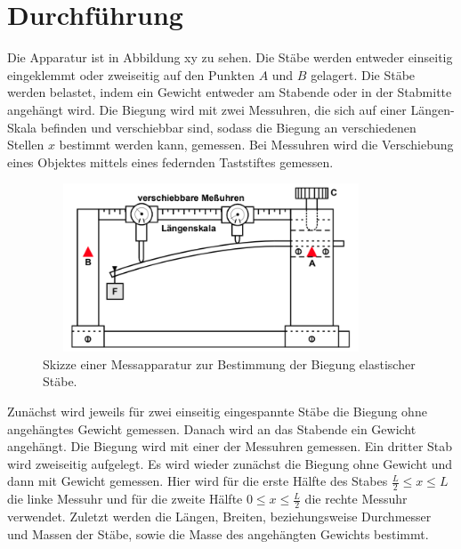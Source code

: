 \section{Durchführung}
Die Apparatur ist in Abbildung xy zu sehen. %
Die Stäbe werden entweder einseitig eingeklemmt oder zweiseitig
auf den Punkten $A$ und $B$ gelagert. Die Stäbe werden belastet, indem
ein Gewicht entweder am Stabende oder in der Stabmitte angehängt wird.
Die Biegung wird mit zwei Messuhren, die sich auf einer Längen-Skala befinden
und verschiebbar sind, sodass die Biegung an verschiedenen Stellen $x$ bestimmt
werden kann, gemessen. Bei Messuhren wird die Verschiebung eines Objektes mittels
eines federnden Taststiftes gemessen. %
\begin{figure}
    \centering
\includegraphics[width= 10cm, height= 5cm]{./plots/abb3.png}
\caption{Skizze einer Messapparatur zur Bestimmung der Biegung elastischer Stäbe.\cite{V103}}
\label{fig:abb3}
\end{figure}

Zunächst wird jeweils für zwei einseitig eingespannte Stäbe die Biegung ohne
angehängtes Gewicht gemessen. Danach wird an das Stabende ein Gewicht angehängt.
Die Biegung wird mit einer der Messuhren gemessen. %
Ein dritter Stab wird
zweiseitig aufgelegt. Es wird wieder zunächst die Biegung ohne Gewicht und dann
mit Gewicht gemessen. Hier wird für die erste Hälfte des Stabes $\frac{L}{2} \leq x \leq L$
die linke Messuhr und für die zweite Hälfte $0 \leq x \leq \frac{L}{2}$ die rechte Messuhr
verwendet. %
Zuletzt werden die Längen, Breiten, beziehungsweise Durchmesser und Massen der Stäbe,
sowie die Masse des angehängten Gewichts bestimmt.


\newpage



\nocite{*}
\newpage
\printbibliography

